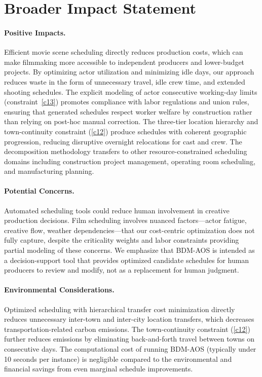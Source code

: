 \section*{Broader Impact Statement}
\label{sec:broader_impact}

\paragraph{Positive Impacts.}
Efficient movie scene scheduling directly reduces production costs, which can make filmmaking more accessible to independent producers and lower-budget projects.
By optimizing actor utilization and minimizing idle days, our approach reduces waste in the form of unnecessary travel, idle crew time, and extended shooting schedules.
The explicit modeling of actor consecutive working-day limits (constraint~\ref{c13}) promotes compliance with labor regulations and union rules, ensuring that generated schedules respect worker welfare by construction rather than relying on post-hoc manual correction.
The three-tier location hierarchy and town-continuity constraint (\ref{c12}) produce schedules with coherent geographic progression, reducing disruptive overnight relocations for cast and crew.
The decomposition methodology transfers to other resource-constrained scheduling domains including construction project management, operating room scheduling, and manufacturing planning.

\paragraph{Potential Concerns.}
Automated scheduling tools could reduce human involvement in creative production decisions.
Film scheduling involves nuanced factors---actor fatigue, creative flow, weather dependencies---that our cost-centric optimization does not fully capture, despite the criticality weights and labor constraints providing partial modeling of these concerns.
We emphasize that BDM-AOS is intended as a decision-support tool that provides optimized candidate schedules for human producers to review and modify, not as a replacement for human judgment.

\paragraph{Environmental Considerations.}
Optimized scheduling with hierarchical transfer cost minimization directly reduces unnecessary inter-town and inter-city location transfers, which decreases transportation-related carbon emissions.
The town-continuity constraint (\ref{c12}) further reduces emissions by eliminating back-and-forth travel between towns on consecutive days.
The computational cost of running BDM-AOS (typically under 10 seconds per instance) is negligible compared to the environmental and financial savings from even marginal schedule improvements.
